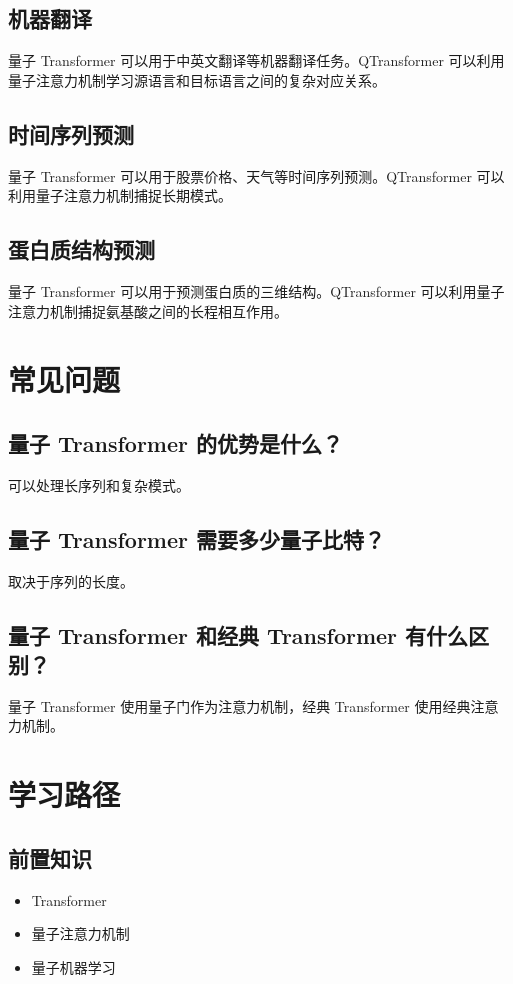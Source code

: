 \documentclass[12pt,a4paper]{article}
\begin{document}
\subsection{机器翻译}

量子 Transformer 可以用于中英文翻译等机器翻译任务。QTransformer 可以利用量子注意力机制学习源语言和目标语言之间的复杂对应关系。

\subsection{时间序列预测}

量子 Transformer 可以用于股票价格、天气等时间序列预测。QTransformer 可以利用量子注意力机制捕捉长期模式。

\subsection{蛋白质结构预测}

量子 Transformer 可以用于预测蛋白质的三维结构。QTransformer 可以利用量子注意力机制捕捉氨基酸之间的长程相互作用。

\section{常见问题}

\subsection{量子 Transformer 的优势是什么？}

可以处理长序列和复杂模式。

\subsection{量子 Transformer 需要多少量子比特？}

取决于序列的长度。

\subsection{量子 Transformer 和经典 Transformer 有什么区别？}

量子 Transformer 使用量子门作为注意力机制，经典 Transformer 使用经典注意力机制。

\section{学习路径}

\subsection{前置知识}
\begin{itemize}
  \item Transformer
  \item 量子注意力机制
  \item 量子机器学习
\end{itemize}
\end{document}
